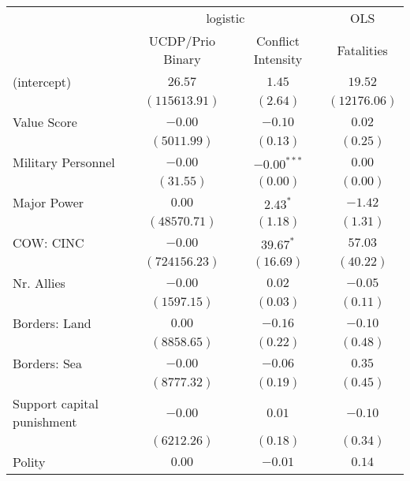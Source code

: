 
\usepackage{booktabs}

\begin{table}
\begin{center}
\begin{tabular}{l c c c}
\toprule
 & \multicolumn{2}{c}{logistic} & \multicolumn{1}{c}{OLS} \\
\cmidrule(lr){2-3} \cmidrule(lr){4-4}
 & UCDP/Prio Binary & Conflict Intensity & Fatalities \\
\midrule
(intercept)                & $26.57$       & $1.45$        & $19.52$      \\
                           & $(115613.91)$ & $(2.64)$      & $(12176.06)$ \\
Value Score                & $-0.00$       & $-0.10$       & $0.02$       \\
                           & $(5011.99)$   & $(0.13)$      & $(0.25)$     \\
Military Personnel         & $-0.00$       & $-0.00^{***}$ & $0.00$       \\
                           & $(31.55)$     & $(0.00)$      & $(0.00)$     \\
Major Power                & $0.00$        & $2.43^{*}$    & $-1.42$      \\
                           & $(48570.71)$  & $(1.18)$      & $(1.31)$     \\
COW: CINC                  & $-0.00$       & $39.67^{*}$   & $57.03$      \\
                           & $(724156.23)$ & $(16.69)$     & $(40.22)$    \\
Nr. Allies                 & $-0.00$       & $0.02$        & $-0.05$      \\
                           & $(1597.15)$   & $(0.03)$      & $(0.11)$     \\
Borders: Land              & $0.00$        & $-0.16$       & $-0.10$      \\
                           & $(8858.65)$   & $(0.22)$      & $(0.48)$     \\
Borders: Sea               & $-0.00$       & $-0.06$       & $0.35$       \\
                           & $(8777.32)$   & $(0.19)$      & $(0.45)$     \\
Support capital punishment & $-0.00$       & $0.01$        & $-0.10$      \\
                           & $(6212.26)$   & $(0.18)$      & $(0.34)$     \\
Polity                     & $0.00$        & $-0.01$       & $0.14$       \\

\end{tabular}
\end{center}
\end{table}
